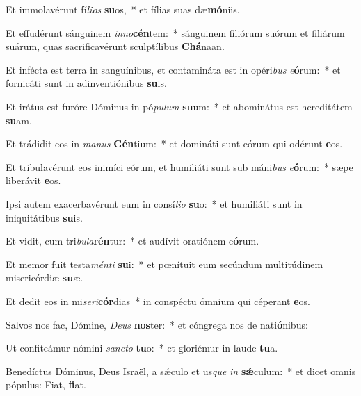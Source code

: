 \item Et immolavérunt fí\textit{li}\textit{os} \textbf{su}os,~* et fílias suas dæ\textbf{mó}niis.
\item Et effudérunt sánguinem \textit{in}\textit{no}\textbf{cén}tem:~* sánguinem filiórum suórum et filiárum suárum, quas sacrificavérunt sculptílibus \textbf{Chá}naan.
\item Et infécta est terra in sanguínibus, et contamináta est in opéri\textit{bus} \textit{e}\textbf{ó}rum:~* et fornicáti sunt in adinventiónibus \textbf{su}is.
\item Et irátus est furóre Dóminus in pó\textit{pu}\textit{lum} \textbf{su}um:~* et abominátus est hereditátem \textbf{su}am.
\item Et trádidit eos in \textit{ma}\textit{nus} \textbf{Gén}tium:~* et domináti sunt eórum qui odérunt \textbf{e}os.
\item Et tribulavérunt eos inimíci eórum, et humiliáti sunt sub máni\textit{bus} \textit{e}\textbf{ó}rum:~* sæpe liberávit \textbf{e}os.
\item Ipsi autem exacerbavérunt eum in consí\textit{li}\textit{o} \textbf{su}o:~* et humiliáti sunt in iniquitátibus \textbf{su}is.
\item Et vidit, cum tri\textit{bu}\textit{la}\textbf{rén}tur:~* et audívit oratiónem e\textbf{ó}rum.
\item Et memor fuit testa\textit{mén}\textit{ti} \textbf{su}i:~* et pœnítuit eum secúndum multitúdinem misericórdiæ \textbf{su}æ.
\item Et dedit eos in mi\textit{se}\textit{ri}\textbf{cór}dias~* in conspéctu ómnium qui céperant \textbf{e}os.
\item Salvos nos fac, Dómine, \textit{De}\textit{us} \textbf{nos}ter:~* et cóngrega nos de nati\textbf{ó}nibus:
\item Ut confiteámur nómini \textit{sanc}\textit{to} \textbf{tu}o:~* et gloriémur in laude \textbf{tu}a.
\item Benedíctus Dóminus, Deus Israël, a sǽculo et us\textit{que} \textit{in} \textbf{sǽ}culum:~* et dicet omnis pópulus: Fiat, \textbf{fi}at.
